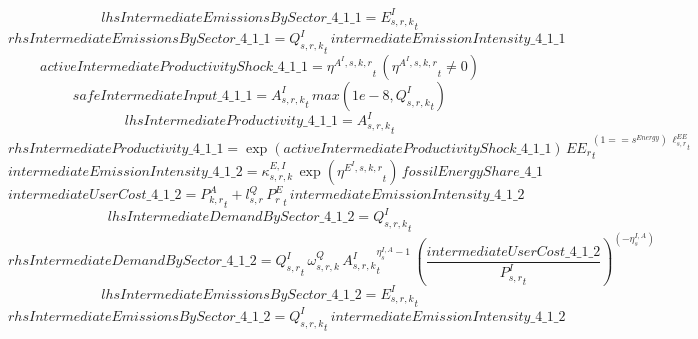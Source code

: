 \begin{dmath*}
lhsIntermediateEmissionsBySector\_4\_1\_1 = {{E^I_{s,r,k}}}_{t}
\end{dmath*}
\begin{dmath*}
rhsIntermediateEmissionsBySector\_4\_1\_1 = {{Q^{I}_{s,r,k}}}_{t}\, {intermediateEmissionIntensity\_4\_1\_1}
\end{dmath*}
\begin{dmath*}
activeIntermediateProductivityShock\_4\_1\_1 = {{\eta^{A^{I},s,k,r}}}_{t}\, \left({{\eta^{A^{I},s,k,r}}}_{t}\neq 0\right)
\end{dmath*}
\begin{dmath*}
safeIntermediateInput\_4\_1\_1 = {{A^{I}_{s,r,k}}}_{t}\, max(1e-8,{{Q^{I}_{s,r,k}}}_{t})
\end{dmath*}
\begin{dmath*}
lhsIntermediateProductivity\_4\_1\_1 = {{A^{I}_{s,r,k}}}_{t}
\end{dmath*}
\begin{dmath*}
rhsIntermediateProductivity\_4\_1\_1 = \exp\left({activeIntermediateProductivityShock\_4\_1\_1}\right)\, {{EE_r}}_{t}^{\left(1=={{s^{Energy}}}\right)\, {{\ell^{EE}_{s,r}}}_{t}}
\end{dmath*}
\begin{dmath*}
intermediateEmissionIntensity\_4\_1\_2 = {{\kappa^{E,I}_{s,r,k}}}\, \exp\left({{\eta^{E^{I},s,k,r}}}_{t}\right)\, {fossilEnergyShare\_4\_1}
\end{dmath*}
\begin{dmath*}
intermediateUserCost\_4\_1\_2 = {{P^{A}_{k,r}}}_{t}+{{l^{Q}_{s,r}}}\, {{P^E_r}}_{t}\, {intermediateEmissionIntensity\_4\_1\_2}
\end{dmath*}
\begin{dmath*}
lhsIntermediateDemandBySector\_4\_1\_2 = {{Q^{I}_{s,r,k}}}_{t}
\end{dmath*}
\begin{dmath*}
rhsIntermediateDemandBySector\_4\_1\_2 = {{Q^{I}_{s,r}}}_{t}\, {{\omega^{Q}_{s,r,k}}}\, {{A^{I}_{s,r,k}}}_{t}^{{{\eta^{I,A}_{s}}}-1}\, \left(\frac{{intermediateUserCost\_4\_1\_2}}{{{P^{I}_{s,r}}}_{t}}\right)^{\left(-{{\eta^{I,A}_{s}}}\right)}
\end{dmath*}
\begin{dmath*}
lhsIntermediateEmissionsBySector\_4\_1\_2 = {{E^I_{s,r,k}}}_{t}
\end{dmath*}
\begin{dmath*}
rhsIntermediateEmissionsBySector\_4\_1\_2 = {{Q^{I}_{s,r,k}}}_{t}\, {intermediateEmissionIntensity\_4\_1\_2}
\end{dmath*}
